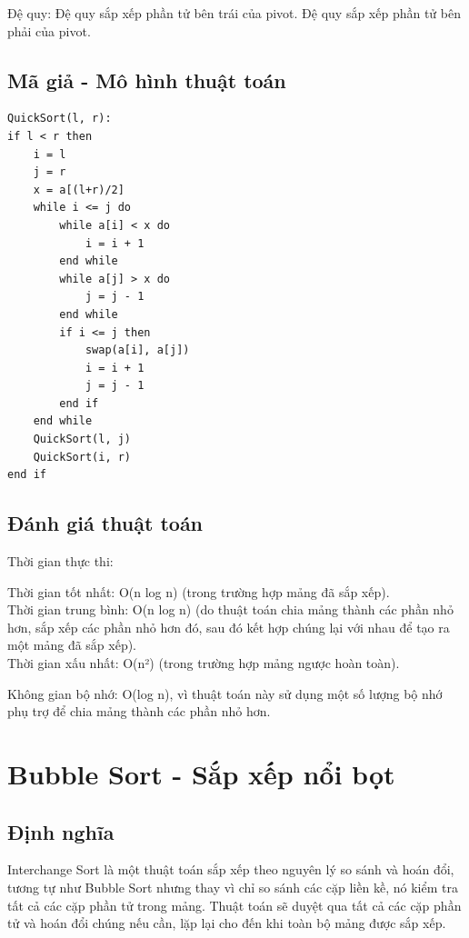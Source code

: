\documentclass[12pt,a4paper]{report}
\begin{document}
Đệ quy:
Đệ quy sắp xếp phần tử bên trái của pivot.
Đệ quy sắp xếp phần tử bên phải của pivot.

\subsection{ Mã giả - Mô hình thuật toán}

\begin{lstlisting}
QuickSort(l, r):
if l < r then
    i = l
    j = r
    x = a[(l+r)/2]
    while i <= j do
        while a[i] < x do
            i = i + 1
        end while
        while a[j] > x do
            j = j - 1
        end while
        if i <= j then
            swap(a[i], a[j])
            i = i + 1
            j = j - 1
        end if
    end while
    QuickSort(l, j)
    QuickSort(i, r)
end if
\end{lstlisting}

\subsection{ Đánh giá thuật toán}

{Thời gian thực thi:

\hspace{0.5cm} Thời gian tốt nhất: O(n log n) (trong trường hợp mảng đã sắp xếp).\\

\hspace{0.5cm} Thời gian trung bình: O(n log n) (do thuật toán chia mảng thành các phần nhỏ hơn, sắp xếp các phần nhỏ hơn đó, sau đó kết hợp chúng lại với nhau để tạo ra một mảng đã sắp xếp).\\

\hspace{0.5cm} Thời gian xấu nhất: O(n²) (trong trường hợp mảng ngược hoàn toàn).\\}

{Không gian bộ nhớ: O(log n), vì thuật toán này sử dụng một số lượng bộ nhớ phụ trợ để chia mảng thành các phần nhỏ hơn.}

\section{ Bubble Sort - Sắp xếp nổi bọt}
 
\subsection{ Định nghĩa}

{\large \hspace{1cm} Interchange Sort là một thuật toán sắp xếp theo nguyên lý so sánh và hoán đổi, tương tự như Bubble Sort nhưng thay vì chỉ so sánh các cặp liền kề, nó kiểm tra tất cả các cặp phần tử trong mảng. Thuật toán sẽ duyệt qua tất cả các cặp phần tử và hoán đổi chúng nếu cần, lặp lại cho đến khi toàn bộ mảng được sắp xếp.}
\end{document}

